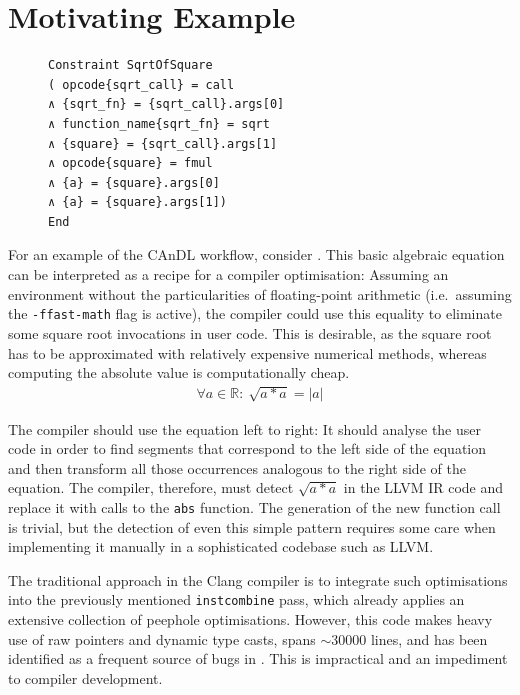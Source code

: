 \section{Motivating Example}

\begin{figure}[b]
\centering
\begin{minipage}[t]{0.68\textwidth}
\begin{lstlisting}[language=CAnDL,label={fig:candlspec},caption=
   {The left side of \Cref{fig:root} as specified in CAnDL}]
Constraint SqrtOfSquare
( opcode{sqrt_call} = call
∧ {sqrt_fn} = {sqrt_call}.args[0]
∧ function_name{sqrt_fn} = sqrt
∧ {square} = {sqrt_call}.args[1]
∧ opcode{square} = fmul
∧ {a} = {square}.args[0]
∧ {a} = {square}.args[1])
End
\end{lstlisting}
\end{minipage}
\end{figure}

    For an example of the CAnDL workflow, consider .
    This basic algebraic equation can be interpreted as a recipe for a compiler
    optimisation:
    Assuming an environment without the particularities of floating-point
    arithmetic (i.e.\ assuming the \texttt{-ffast-math} flag is active), the
    compiler could use this equality to eliminate some square root invocations
    in user code.
    This is desirable, as the square root has to be approximated with relatively
    expensive numerical methods, whereas computing the absolute value is
    computationally cheap.
    \begin{align}
    \label{fig:root}
    \forall a\in \mathbb{R}\colon\ \sqrt{a*a}=|a|
    \end{align}

    The compiler should use the equation left to right:
    It should analyse the user code in order to find segments that correspond to
    the left side of the equation and then transform all those occurrences
    analogous to the right side of the equation.
    The compiler, therefore, must detect $\sqrt{a*a}$ in the LLVM IR code and
    replace it with calls to the \texttt{abs} function.
    The generation of the new function call is trivial, but the detection of
    even this simple pattern requires some care when implementing it manually in
    a sophisticated codebase such as LLVM.

    The traditional approach in the Clang compiler is to integrate such
    optimisations into the previously mentioned \texttt{instcombine} pass, which
    already applies an extensive collection of peephole optimisations.
    However, this code makes heavy use of raw pointers and dynamic type casts,
    spans $\sim30000$ lines, and has been identified as a frequent source of
    bugs in
    \citet{Menendez:2017:ADP:3062341.3062372,Yang:2011:FUB:1993316.1993532}.
    This is impractical and an impediment to compiler development.

